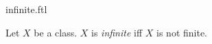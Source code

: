 \documentclass{stex}
\begin{document}
\begin{smodule}{infinite.ftl}


\begin{definition}[forthel,id=InfiniteDef]
  Let $X$ be a class.
  $X$ is \emph{infinite} iff $X$ is not finite.
\end{definition}

\end{smodule}
\end{document}
